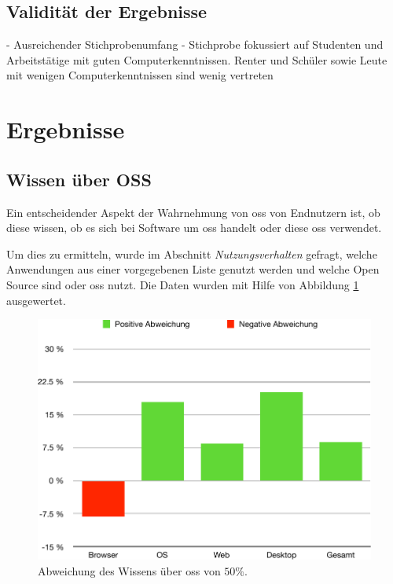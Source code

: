 \documentclass[a4paper]{article}
\begin{document}
        \subsection{Validität der Ergebnisse}
            - Ausreichender Stichprobenumfang
            - Stichprobe fokussiert auf Studenten und Arbeitstätige mit guten Computerkenntnissen. Renter und Schüler sowie Leute mit wenigen Computerkenntnissen sind wenig vertreten

    \section{Ergebnisse}
        \subsection{Wissen über OSS}
            Ein entscheidender Aspekt der Wahrnehmung von \gls{oss} von Endnutzern ist, ob diese wissen, ob es sich bei Software um \gls{oss} handelt oder diese \gls{oss} verwendet.
            
            Um dies zu ermitteln, wurde im Abschnitt \emph{Nutzungsverhalten} gefragt, welche Anwendungen aus einer vorgegebenen Liste genutzt werden und welche Open Source sind oder \gls{oss} nutzt. Die Daten wurden mit Hilfe von Abbildung \ref{figure:knowledge_difference} ausgewertet.
            
                        
            \begin{figure}
                \includegraphics[width=\textwidth]{assets/results/openSourceJudging/openSourceJudgingDetailedOSSOnly2.pdf}
                \caption{Abweichung des Wissens über \gls{oss} von $50\%$.}
                \label{figure:knowledge_difference}
            \end{figure}
            
\end{document}
